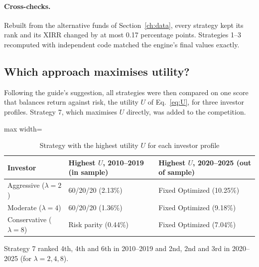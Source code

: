 \paragraph{Cross-checks.} Rebuilt from the alternative funds of Section~\ref{ch:data}, every
strategy kept its rank and its XIRR changed by at most 0.17 percentage points. Strategies 1--3
recomputed with independent code matched the engine's final values exactly.

\subsection{Which approach maximises utility?}
\label{sec:res-utility}

Following the guide's suggestion, all strategies were then compared on one score that balances
return against risk, the utility $U$ of Eq.~\eqref{eq:U}, for three investor profiles. Strategy 7,
which maximises $U$ directly, was added to the competition.

\begin{table}[H]
\centering
\caption{Strategy with the highest utility $U$ for each investor profile}
\label{tab:utility}
\begin{adjustbox}{max width=\textwidth}
\begin{tabular}{@{}lll@{}}
\toprule
Investor & Highest $U$, 2010--2019 (in sample) & Highest $U$, 2020--2025 (out of sample) \\
\midrule
Aggressive ($\lambda=2$) & 60/20/20 (2.13\%) & Fixed Optimized (10.25\%) \\
Moderate ($\lambda=4$) & 60/20/20 (1.36\%) & Fixed Optimized (9.18\%) \\
Conservative ($\lambda=8$) & Risk parity (0.44\%) & Fixed Optimized (7.04\%) \\
\bottomrule
\end{tabular}
\end{adjustbox}
\end{table}

Strategy 7 ranked 4th, 4th and 6th in 2010--2019 and 2nd, 2nd and 3rd in 2020--2025 (for $\lambda = 2, 4, 8$).

